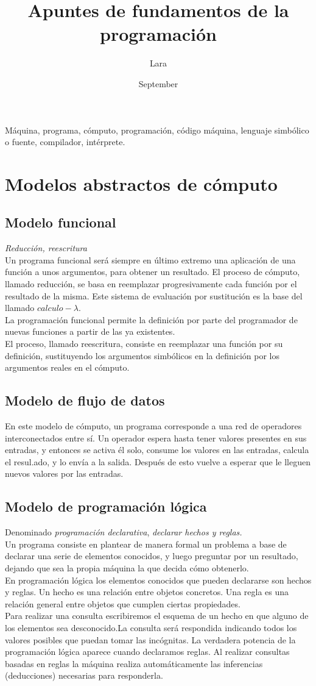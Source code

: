 \documentclass[11pt,a4paper]{article}
\title{Apuntes de fundamentos de la programación}
\author{Lara}
\date{September}
\begin{document}
	\maketitle
	Máquina, programa, cómputo, programación, código máquina, lenguaje simbólico o fuente, compilador, intérprete. 
	\section{Modelos abstractos de cómputo}
	\subsection{Modelo funcional}
	\textit{Reducción, reescritura}\\
	Un programa funcional será siempre en último
	extremo una aplicación de una función a unos argumentos, para obtener un
	resultado. El proceso de cómputo, llamado reducción, se basa en reemplazar progresivamente cada función por el resultado de la misma. Este sistema de evaluación por sustitución es la base del llamado $calculo-\lambda$. \\ La programación funcional permite la definición por parte del programador de nuevas funciones a
	partir de las ya existentes.\\ El proceso, llamado reescritura, consiste en reemplazar una función por su definición, sustituyendo los argumentos simbólicos en la definición por los argumentos reales en el cómputo.
	\subsection{Modelo de flujo de datos}
	En este modelo de cómputo, un programa corresponde a una red de operadores interconectados entre sí. Un operador espera hasta tener valores presentes en sus entradas, y entonces se activa él solo, consume los valores en las entradas,
	calcula el resul.ado, y lo envía a la salida. Después de esto vuelve a esperar
	que le lleguen nuevos valores por las entradas. 
	\subsection{Modelo de programación lógica}
	Denominado \textit{programación declarativa}, \textit{declarar hechos y reglas.} \\
	Un programa consiste en plantear de manera
	formal un problema a base de declarar una serie de elementos conocidos, y luego preguntar por un resultado, dejando que sea la propia máquina la que decida cómo obtenerlo. \\
	En programación lógica los elementos conocidos que pueden declararse son hechos y reglas. Un hecho es una relación entre objetos concretos. Una regla es una relación general entre objetos que cumplen ciertas propiedades.\\
	Para realizar una consulta escribiremos el esquema de un hecho en que alguno
	de los elementos sea desconocido.La consulta será respondida indicando todos los
	valores posibles que puedan tomar las incógnitas. 
	La verdadera potencia de la programación lógica aparece cuando declaramos
	reglas. Al realizar consultas basadas en reglas la máquina realiza automáticamente las inferencias (deducciones) necesarias para responderla. 
\end{document}
